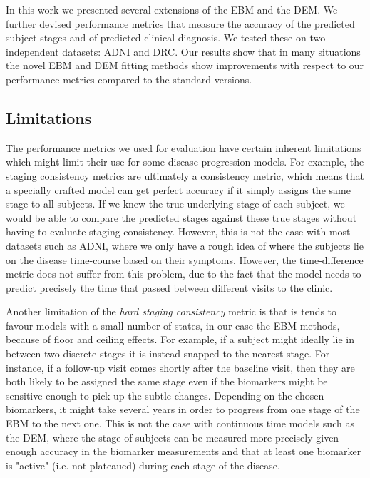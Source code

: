 In this work we presented several extensions of the EBM and the DEM. We further devised performance metrics that measure the accuracy of the predicted subject stages and of predicted clinical diagnosis. We tested these on two independent datasets: ADNI and DRC. Our results show that in many situations the novel EBM and DEM fitting methods show improvements with respect to our performance metrics compared to the standard versions. 

\subsection{Limitations}

The performance metrics we used for evaluation have certain inherent limitations which might limit their use for some disease progression models. For example, the staging consistency metrics are ultimately a consistency metric, which means that a specially crafted model can get perfect accuracy if it simply assigns the same stage to all subjects. If we knew the true underlying stage of each subject, we would be able to compare the predicted stages against these true stages without having to evaluate staging consistency. However, this is not the case with most datasets such as ADNI, where we only have a rough idea of where the subjects lie on the disease time-course based on their symptoms. However, the time-difference metric does not suffer from this problem, due to the fact that the model needs to predict precisely the time that passed between different visits to the clinic. 

Another limitation of the \emph{hard staging consistency} metric is that is tends to favour models with a small number of states, in our case the EBM methods, because of floor and ceiling effects. For example, if a subject might ideally lie in between two discrete stages it is instead snapped to the nearest stage. For instance, if a follow-up visit comes shortly after the baseline visit, then they are both likely to be assigned the same stage even if the biomarkers might be sensitive enough to pick up the subtle changes. Depending on the chosen biomarkers, it might take several years in order to progress from one stage of the EBM to the next one. This is not the case with continuous time models such as the DEM, where the stage of subjects can be measured more precisely given enough accuracy in the biomarker measurements and that at least one biomarker is "active" (i.e. not plateaued) during each stage of the disease.

